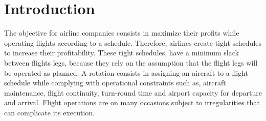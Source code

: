\documentclass[ijoo,nonblindrev]{informs-ijoo}
\begin{document}
%


\section{Introduction}

The objective for airline companies consists in maximize their profits while operating flights according to a schedule. Therefore, airlines create tight schedules to increase their profitability. These tight schedules, have a minimum slack between flights legs, because they rely on the assumption that the flight legs will be operated as planned. A rotation consists in assigning an aircraft to a flight schedule while complying with operational constraints such as, aircraft maintenance, flight continuity, turn-round time and airport capacity for departure and arrival. Flight operations are on many occasions subject to irregularities that can complicate its execution. 
\end{document}
